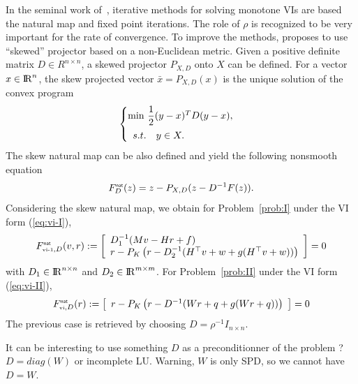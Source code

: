 In the seminal work of~\cite{Sibony1970}, iterative methods for solving monotone VIs are based the natural map and fixed point iterations. The role of $\rho$ is recognized to be very important for the rate of convergence. To improve the methods, \citet{Sibony1970} proposes to use ``skewed'' projector based on a non-Euclidean metric. Given a positive definite matrix $D\in R^{n\times n}$, a skewed projector $P_{X,D}$ onto $X$ can be defined. For a vector $x\in \mathrm{I\!R}^n$, the skew projected vector $\bar x  = P_{X,D}(x)$ is the unique solution of the convex program
\begin{equation}
  \label{eq:opt-proj-skew}
  \begin{cases}
    \min\, \Frac 1 2 (y-x)^T D (y-x), \\[2mm]
    \begin{array}{ll}
    s.t. & y \in X .
  \end{array}
  \end{cases}
\end{equation} 
The skew natural map can be also defined and yield the following nonsmooth equation
\begin{equation}
  \label{eq:skew-natural-NE}
   F_D^\nat(z) = z - P_{X,D}(z-D^{-1} F(z)).
\end{equation}
Considering the skew natural map, we obtain for Problem~\ref{prob:I} under the VI form (\ref{eq:vi-I}),
\begin{equation}
  \label{eq:natural-typeI}
  F_{\vione,D}^\nat(v,r) := \left[
  \begin{array}{l}
    D_1^{-1} (Mv - Hr + f) \\ 
    r - P_{K}\left(r  - D_2^{-1} (H^\top v + w  + g(H^\top v + w))\right)
  \end{array}\right] = 0
\end{equation}
with $D_1\in \mathrm{I\!R}^{n\times n}$ and $D_2\in \mathrm{I\!R}^{m\times m}$.
For Problem~\ref{prob:II} under the VI form (\ref{eq:vi-II}),
\begin{equation}
  \label{eq:natural-typeII}
  F_{\vitwo,D}^\nat(r) := \left[
  \begin{array}{l} 
    r - P_{K}\left(r  - D^{-1} ( W r +q   + g(Wr+q))\right)  \end{array}\right] = 0
\end{equation}
The previous case is retrieved by choosing $D = \rho^{-1} I_{n\times n}$. 





\begin{ndrva}
  It can be interesting to use something $D$ as a preconditionner of the problem ? $D=diag(W)$ or incomplete LU. Warning, $W$ is only SPD, so we cannot have $D =W$.
\end{ndrva}

